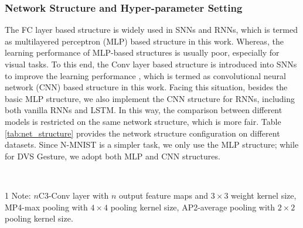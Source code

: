 \documentclass[journal,10pt,twocolumn]{IEEETran}
\begin{document}
\bigskip
\subsubsection{Network Structure and Hyper-parameter Setting}\quad

The FC layer based structure is widely used in SNNs and RNNs, which is termed as multilayered perceptron (MLP) based structure in this work. Whereas, the learning performance of MLP-based structures is usually poor, especially for visual tasks. To this end, the Conv layer based structure is introduced into SNNs to improve the learning performance \cite{wu2019direct}, which is termed as convolutional neural network (CNN) based structure in this work. Facing this situation, besides the basic MLP structure, we also implement the CNN structure for RNNs, including both vanilla RNNs and LSTM. In this way, the comparison between different models is restricted on the same network structure, which is more fair. Table \ref{tab:net_structure} provides the network structure configuration on different datasets. Since N-MNIST is a simpler task, we only use the MLP structure; while for DVS Gesture, we adopt both MLP and CNN structures.

\begin{table}[!htbp]
\caption{Network structure configuration.}
\label{tab:net_structure}
\vspace{2pt}
\centering
\renewcommand\arraystretch{1.3}
\\
 \begin{tablenotes}
\item[1] \footnotesize{\small Note: $n$C3-Conv layer with $n$ output feature maps and $3\times 3$ weight kernel size, MP4-max pooling with $4\times 4$ pooling kernel size, AP2-average pooling with $2\times 2$ pooling kernel size.}
\end{tablenotes}
\end{table}
\end{document}
